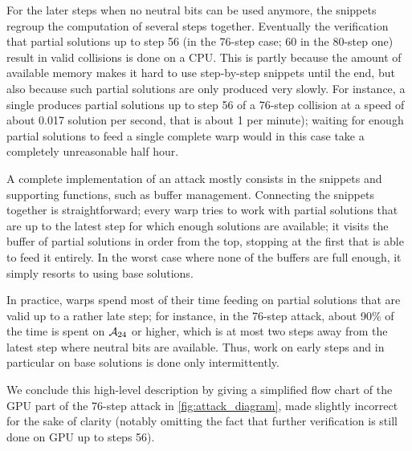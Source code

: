 For the
later steps when no neutral bits can be used anymore, the snippets regroup the computation of several steps together.
Eventually the verification that partial solutions up to step 56 (in the 76-step case; 60 in the 80-step one) result in valid collisions is done on a CPU. This is partly because
the amount of available memory makes it hard to use step-by-step snippets until the end, but also because such partial solutions are only
produced very slowly. For instance, a single \gtx produces partial solutions up to step 56 of a 76-step collision at a speed of about 0.017 solution per second, that is about
1 per minute); waiting for enough partial solutions to feed a single complete warp would in this case take a completely unreasonable half hour.

\bigskip


A complete implementation of an attack mostly consists in the snippets and supporting functions, such as buffer management.
Connecting the snippets together is straightforward; every warp tries to work with partial solutions that are up
to the latest step for which enough solutions are available; \ie it visits the buffer of partial solutions in order from the top,
stopping at the first that is able to feed it entirely.
In the worst case where none of the buffers are full enough, it simply resorts to using base solutions.

In practice, warps spend most of their time feeding on partial solutions that are valid up to a rather late step; for instance, in the 76-step attack,
about 90\% of the time is spent on $\mathcal{A}_{24}$ or higher, which is at most two steps away from the latest step where neutral bits are available.
Thus, work on early steps and in particular on base solutions is done only intermittently.

We conclude this high-level description by giving a simplified flow chart
of the GPU part of the 76-step attack in \autoref{fig:attack_diagram}, made slightly incorrect for the sake of clarity (notably omitting the fact that further verification is still done on GPU up to steps 56).

\def\rectanMac{\begin{tikzpicture}[scale=0.2]\draw (0,0) rectangle (1,1);\end{tikzpicture}}
\def\elliMac{\begin{tikzpicture}[scale=0.3,transform shape]\node[draw,ellipse] (e) at (0,0) {\phantom{toto}};\end{tikzpicture}}
\def\plainMac{\begin{tikzpicture}[scale=0.1] \draw[>=latex,->] (0,0) -- (2,2);\end{tikzpicture}}
\def\dottMac{\begin{tikzpicture}[scale=0.1] \draw[dotted,->]   (0,0) -- (2,2);\end{tikzpicture}}

